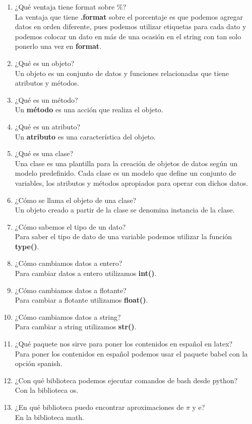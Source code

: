 \documentclass[letterpaper, 12pt, oneside]{article}%
\begin{document}
\begin{enumerate}
		\item ¿Qué ventaja tiene format sobre \%? \\ La ventaja que tiene \textbf{.format} sobre el porcentaje es que podemos agregar datos en orden diferente, pues podemos utilizar etiquetas para cada dato y podemos colocar un dato en más de una ocasión en el string con tan solo ponerlo una vez en \textbf{format}.
		\item ¿Qué es un objeto? \\ Un objeto es un conjunto de datos y funciones relacionadas que tiene atributos y métodos.
		\item ¿Qué es un método? \\ Un \textbf{método} es una acción que realiza el objeto.
		\item ¿Qué es un atributo? \\ Un \textbf{atributo} es una característica del objeto.
		\item ¿Qué es una clase? \\ Una clase es una plantilla para la creación de objetos de datos según un modelo predefinido. Cada clase es un modelo que define un conjunto de variables, los atributos y métodos apropiados para operar con dichos datos.
		\item ¿Cómo se llama el objeto de una clase? \\ Un objeto creado a partir de la clase se denomina instancia de la clase.
		\item ¿Cómo sabemos el tipo de un dato? \\ Para saber el tipo de dato de una variable podemos utilizar la función \textbf{type()}.
		\item  ¿Cómo cambiamos datos a entero? \\ Para cambiar datos a entero utilizamos \textbf{int()}.
		\item ¿Cómo cambiamos datos a flotante? \\ Para cambiar a flotante utilizamos \textbf{float()}.
		\item ¿Cómo cambiamos datos a string? \\ Para cambiar a string utilizamos \textbf{str()}.
		\item ¿Qué paquete nos sirve para poner los contenidos en español en latex? \\ Para poner los contenidos en español podemos usar el paquete babel con la opción spanish.
		\item ¿Con qué biblioteca podemos ejecutar comandos de bash desde python? \\ Con la biblioteca os.
		\item ¿En qué biblioteca puedo encontrar aproximaciones de $\pi$ y e? \\ En la biblioteca math.
	\end{enumerate}
\end{document}
